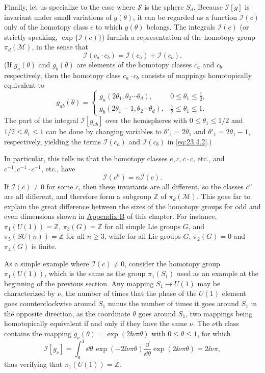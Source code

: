 Finally, let us specialize to the case where $\mathcal S$ is the sphere
$S_d$. Because $\mathcal I[g]$ is invariant under small variations of
$g(\theta)$, it can be regarded as a function $\mathcal I(c)$ only of the
homotopy class $c$ to which $g(\theta)$ belongs. The integrals
$\mathcal I(c)$ (or strictly speaking, $\exp\{\mathcal I(c)\}$) furnish a
representation of the homotopy group $\pi_d(\mathcal M)$, in the sense
that
\begin{equation}
\mathcal I(c_a\cdot c_b)=\mathcal I(c_a)+\mathcal I(c_b).
\tag{23.4.2}\label{eq:23.4.2}
\end{equation}
(If $g_a(\theta)$ and $g_b(\theta)$ are elements of the homotopy classes
$c_a$ and $c_b$ respectively, then the homotopy class $c_a\cdot c_b$
consists of mappings homotopically equivalent to
\[
g_{ab}(\theta)=
\begin{cases}
g_a(2\theta_1,\theta_2\cdots\theta_d),
&0\leq\theta_1\leq\tfrac12,\\
g_b(2\theta_1-1,\theta_2\cdots\theta_d),
&\tfrac12\leq\theta_1\leq1.
\end{cases}
\]
The part of the integral $\mathcal I[g_{ab}]$ over the hemispheres with
$0\leq\theta_1\leq1/2$ and $1/2\leq\theta_1\leq1$ can be done by changing
variables to $\theta'_1=2\theta_1$ and $\theta'_1=2\theta_1-1$,
respectively, yielding the terms $\mathcal I(c_a)$ and $\mathcal I(c_b)$
in \eqref{eq:23.4.2}.)

In particular, this tells us that the homotopy classes
$e,c,c\cdot c$, etc., and $c^{-1},c^{-1}\cdot c^{-1}$, etc., have
\begin{equation}
\mathcal I(c^n)=n\mathcal I(c).
\tag{23.4.3}\label{eq:23.4.3}
\end{equation}
If $\mathcal I(c)\ne0$ for some $c$, then these invariants are all
different, so the classes $c^n$ are all different, and therefore form a
subgroup $\mathbb{Z}$ of $\pi_d(\mathcal M)$. This goes far to explain the great
difference between the sizes of the homotopy groups for odd and even
dimensions shown in \hyperref[app:23.B]{Appendix B} of this chapter. For instance,
$\pi_1(U(1))=\mathbb{Z}$, $\pi_3(G)=\mathbb{Z}$ for all simple Lie groups $G$, and
$\pi_5(SU(n))=\mathbb{Z}$ for all $n\geq3$, while for all Lie groups $G$,
$\pi_2(G)=0$ and $\pi_4(G)$ is finite.

As a simple example where $\mathcal I(c)\ne0$, consider the homotopy
group $\pi_1(U(1))$, which is the same as the group $\pi_1(S_1)$ used as
an example at the beginning of the previous section. Any mapping
$S_1\mapsto U(1)$ may be characterized by $\nu$, the number of times that
the phase of the $U(1)$ element goes counterclockwise around $S_1$ minus
the number of times it goes around $S_1$ in the opposite direction, as
the coordinate $\theta$ goes around $S_1$, two mappings being
homotopically equivalent if and only if they have the same $\nu$. The
$\nu$th class contains the mapping
$g_\nu(\theta)=\exp(2\ii\nu\pi\theta)$ with $0\leq\theta\leq1$, for which
\[
\mathcal I[g_\nu]
=\int_0^1\dd\theta\,\exp(-2\ii\nu\pi\theta)
\frac{\dd}{\dd\theta}\exp(2\ii\nu\pi\theta)
=2\ii\nu\pi,
\]
thus verifying that $\pi_1(U(1))=\mathbb{Z}$.

